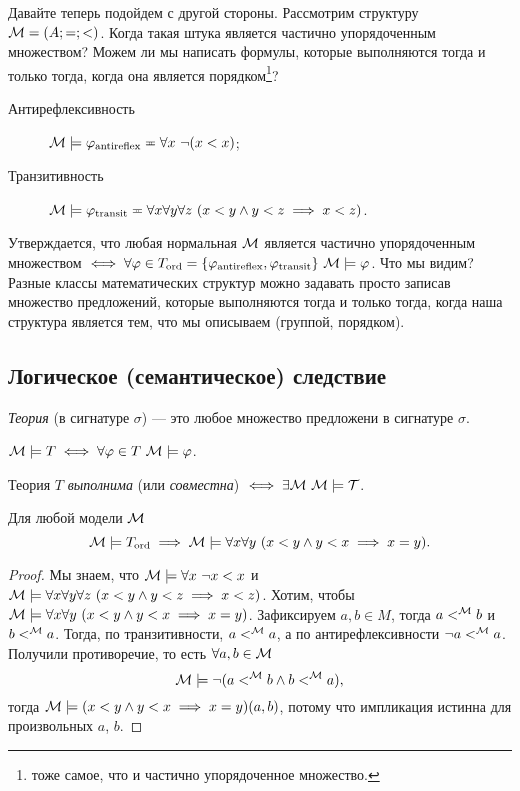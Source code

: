 Давайте теперь подойдем с другой стороны.
Рассмотрим структуру $\mathcal{M} = (A; =; <)$.
Когда такая штука является частично упорядоченным множеством?
Можем ли мы написать формулы, которые выполняются тогда и только тогда, когда она является порядком\footnote{тоже самое, что и частично упорядоченное множество.}?
\begin{description}
    \item[Антирефлексивность] $\mathcal{M} \models \varphi_{\text{antireflex}} \eqcirc \forall x~ \neg (x < x)$;
    \item[Транзитивность] $\mathcal{M} \models \varphi_{\text{transit}} \eqcirc \forall x \forall y \forall z~ (x < y \land y < z \implies x < z)$.
\end{description}
Утверждается, что любая нормальная $\mathcal{M}$ является частично упорядоченным множеством $\iff \forall \varphi \in T_{\text{ord}} = \{\varphi_{\text{antireflex}}, \varphi_{\text{transit}}\}~ \mathcal{M} \models \varphi$.
Что мы видим?
Разные классы математических структур можно задавать просто записав множество предложений, которые выполняются тогда и только тогда, когда наша структура является тем, что мы описываем (группой, порядком).

\subsection{Логическое (семантическое) следствие}

\begin{definition}
    {\it Теория} (в сигнатуре $\sigma$) --- это любое множество предложени в сигнатуре $\sigma$.
\end{definition}

\begin{definition}
    $\mathcal{M} \models T \iff \forall \varphi \in T~ \mathcal{M} \models \varphi$.
\end{definition}

\begin{definition}
    Теория $T$ {\it выполнима} (или {\it совместна}) $\iff \exists \mathcal{M}~ \mathcal{M} \models \mathcal{T}$.
\end{definition}

\begin{statement}
    Для любой модели $\mathcal{M}$
    $$
        \mathcal{M} \models T_{\text{ord}} \implies \mathcal{M} \models \forall x \forall y~ (x < y \land y < x \implies x = y).
    $$
\end{statement}

\begin{proof}
    Мы знаем, что $\mathcal{M} \models \forall x~ \neg x < x$ и $\mathcal{M} \models \forall x \forall y \forall z~ (x < y \land y < z \implies x < z)$.
    Хотим, чтобы $\mathcal{M} \models \forall x \forall y~ (x < y \land y < x \implies x = y)$.
    Зафиксируем $a, b \in M$, тогда $a <^{\mathcal{M}} b$ и $b <^{\mathcal{M}} a$.
    Тогда, по транзитивности, $a <^{\mathcal{M}} a$, а по антирефлексивности $\neg a <^{\mathcal{M}} a$.
    Получили противоречие, то есть $\forall a, b \in \mathcal{M}$
    $$
        \mathcal{M} \models \neg(a <^{\mathcal{M}} b \land b <^{\mathcal{M}} a),
    $$
    тогда $\mathcal{M} \models (x < y \land y < x \implies x = y)(a, b)$, потому что импликация истинна для произвольных $a$, $b$.
\end{proof}

